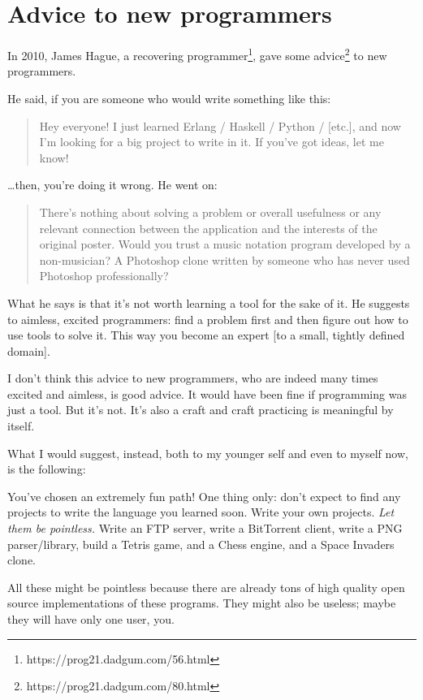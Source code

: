 \section{Advice to new programmers}

In 2010, James Hague, a recovering programmer\footnote{https://prog21.dadgum.com/56.html}, gave some advice\footnote{https://prog21.dadgum.com/80.html} to new programmers.

He said, if you are someone who would write something like this:

\begin{quote}
    Hey everyone! I just learned Erlang / Haskell / Python / [etc.], and now I'm looking for a big project to write in it. If you've got ideas, let me know!
\end{quote}

\dots then, you're doing it wrong. He went on:

\begin{quote}
    There's nothing about solving a problem or overall usefulness or any relevant connection between the application and the interests of the original poster. Would you trust a music notation program developed by a non-musician? A Photoshop clone written by someone who has never used Photoshop professionally?
\end{quote}

What he says is that it’s not worth learning a tool for the sake of it. He suggests to aimless, excited programmers: find a problem first and then figure out how to use tools to solve it. This way you become an expert [to a small, tightly defined domain].

I don’t think this advice to new programmers, who are indeed many times excited and aimless, is good advice. It would have been fine if programming was just a tool. But it’s not. It’s also a craft and craft practicing is meaningful by itself.

What I would suggest, instead, both to my younger self and even to myself now, is the following:

You’ve chosen an extremely fun path! One thing only: don’t expect to find any projects to write the language you learned soon. Write your own projects. \emph{Let them be pointless.} Write an FTP server, write a BitTorrent client, write a PNG parser/library, build a Tetris game, and a Chess engine, and a Space Invaders clone.

All these might be pointless because there are already tons of high quality open source implementations of these programs. They might also be useless; maybe they will have only one user, you.

